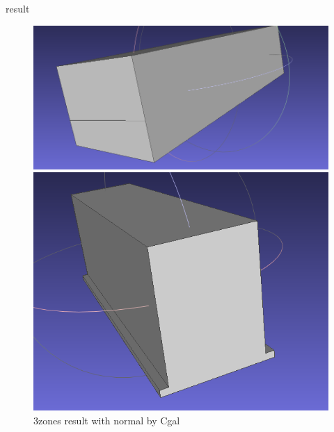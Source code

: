 \documentclass[10pt]{beamer}
\begin{document}
\begin{frame}{result}
    \begin{figure}[H]
        \centering
        \begin{minipage}[t]{0.45\textwidth}
          \includegraphics[width=\textwidth]{../../images/screen_kinetic/3zones_result_normal5_cgal.png}
          \caption*{3zones result with normal by Meshlab}
        \end{minipage}
        \begin{minipage}[t]{0.35\textwidth}
            \includegraphics[width=\textwidth]{../../images/screen_kinetic/3zones_result_normal_cgal.png}
            \caption*{3zones result with normal by Cgal}
          \end{minipage}
      \end{figure}  
\end{frame}
\end{document}
